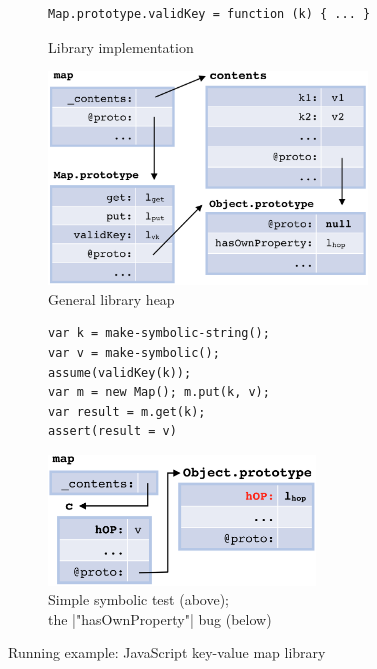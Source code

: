 \begin{figure}[t]
\begin{subfigure}[b]{0.33\textwidth}
{\begin{lstlisting}
Map.prototype.validKey = function (k) { ... }
\end{lstlisting}}
\vspace*{-0.2cm}
\caption{Library implementation}
\label{fig:2a}
\end{subfigure}
%
 \begin{subfigure}[b]{0.33\textwidth}
 \includegraphics[width=0.93\textwidth]{figures/mapDiagram.png}
 \vspace*{0.5cm}
 \caption{General library heap}
 \label{fig:2b}
 \end{subfigure}
 \begin{subfigure}[b]{0.3\textwidth}
 \centering 
 {
\begin{lstlisting}
var k = make-symbolic-string();
var v = make-symbolic();
assume(validKey(k));
var m = new Map(); m.put(k, v); 
var result = m.get(k);
assert(result = v)
\end{lstlisting}}
\vspace*{0.1cm}
 \includegraphics[width=0.78\textwidth]{figures/heapfail.png}
 \captionsetup{format=nastyCaption}
\caption{Simple symbolic test (above); \\the \jsinline|"hasOwnProperty"| bug (below)}
\label{fig:2c}
\end{subfigure}
\vspace*{-0.25cm}
\caption{Running example: JavaScript key-value map library}
\label{fig:two}
 \vspace*{-0.4cm}
\end{figure}

